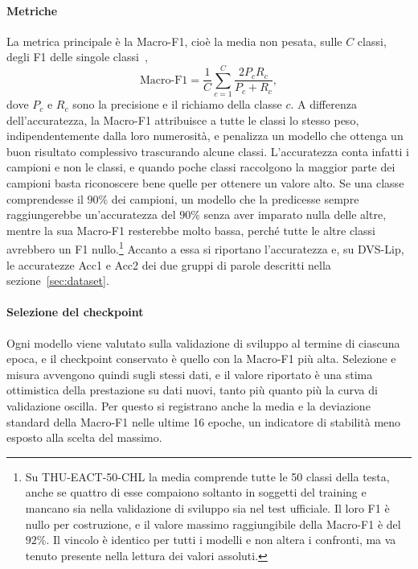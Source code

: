 \paragraph{Metriche}
\label{subsec:macro_f1}
La metrica principale è la Macro-F1, cioè la media non pesata, sulle $C$ classi, degli F1 delle singole classi~\cite{sokolova2009systematic},
\begin{equation}
\label{eq:macro_f1}
\text{Macro-F1}=\frac{1}{C}\sum_{c=1}^{C}\frac{2P_cR_c}{P_c+R_c},
\end{equation}
dove $P_c$ e $R_c$ sono la precisione e il richiamo della classe $c$. A differenza dell'accuratezza, la Macro-F1 attribuisce a tutte le classi lo stesso peso, indipendentemente dalla loro numerosità, e penalizza un modello che ottenga un buon risultato complessivo trascurando alcune classi. L'accuratezza conta infatti i campioni e non le classi, e quando poche classi raccolgono la maggior parte dei campioni basta riconoscere bene quelle per ottenere un valore alto. Se una classe comprendesse il $90\%$ dei campioni, un modello che la predicesse sempre raggiungerebbe un'accuratezza del $90\%$ senza aver imparato nulla delle altre, mentre la sua Macro-F1 resterebbe molto bassa, perché tutte le altre classi avrebbero un F1 nullo.\footnote{Su THU-EACT-50-CHL la media comprende tutte le 50 classi della testa, anche se quattro di esse compaiono soltanto in soggetti del training e mancano sia nella validazione di sviluppo sia nel test ufficiale. Il loro F1 è nullo per costruzione, e il valore massimo raggiungibile della Macro-F1 è del $92\%$. Il vincolo è identico per tutti i modelli e non altera i confronti, ma va tenuto presente nella lettura dei valori assoluti.} Accanto a essa si riportano l'accuratezza e, su DVS-Lip, le accuratezze Acc1 e Acc2 dei due gruppi di parole descritti nella sezione~\ref{sec:dataset}.

\paragraph{Selezione del checkpoint}
\label{subsec:selezione_incertezza}
Ogni modello viene valutato sulla validazione di sviluppo al termine di ciascuna epoca, e il checkpoint conservato è quello con la Macro-F1 più alta. Selezione e misura avvengono quindi sugli stessi dati, e il valore riportato è una stima ottimistica della prestazione su dati nuovi, tanto più quanto più la curva di validazione oscilla. Per questo si registrano anche la media e la deviazione standard della Macro-F1 nelle ultime 16 epoche, un indicatore di stabilità meno esposto alla scelta del massimo.

